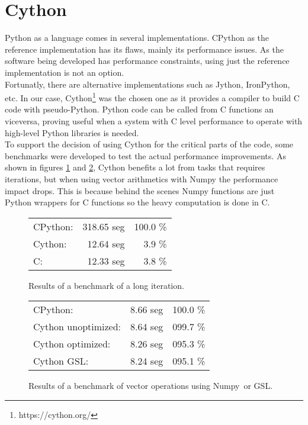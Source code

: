\section{Cython}

Python as a language comes in several implementations. CPython as the reference
implementation has its flaws, mainly its performance issues. As the
software being developed has performance constraints, using just the reference
implementation is not an option.\\

Fortunatly, there are alternative implementations such as Jython, IronPython,
etc. In our case, Cython\footnote{https://cython.org/}\cite{Cython_book} was the
chosen one as it provides a compiler to build C code with pseudo-Python. Python code
can be called from C functions an viceversa, proving useful when a system
with C level performance to operate with high-level Python libraries is needed.\\

To support the decision of using Cython for the critical parts of the code,
some benchmarks were developed to test the actual performance improvements. As
shown in figures \ref{Cython:fig:1} and \ref{Cython:fig:2}, Cython benefits
a lot from tasks that requires iterations, but when using vector arithmetics
with Numpy the performance impact drops. This is because behind the scenes
Numpy functions are just Python wrappers for C functions so the heavy
computation is done in C.\\

\begin{figure}[ht!]
  \begin{center}
    \begin{tabular}{l r r}
      CPython:  & 318.65 seg & 100.0 \% \\
      Cython:   & 12.64 seg  & 3.9 \%   \\
      C:        & 12.33 seg  & 3.8 \%   \\
    \end{tabular}
  \end{center}
  \caption{Results of a benchmark of a long iteration.}
  \label{Cython:fig:1}
\end{figure}

\begin{figure}[ht!]
  \begin{center}
    \begin{tabular}{l r r}
      CPython:            & 8.66 seg & 100.0 \% \\
      Cython unoptimized: & 8.64 seg & 099.7 \% \\
      Cython optimized:   & 8.26 seg & 095.3 \% \\
      Cython GSL:         & 8.24 seg & 095.1 \%
    \end{tabular}
  \end{center}

  \caption{Results of a benchmark of vector operations using
  Numpy\footnotemark  \ or
  GSL\footnotemark.}
  \label{Cython:fig:2}
\end{figure}

